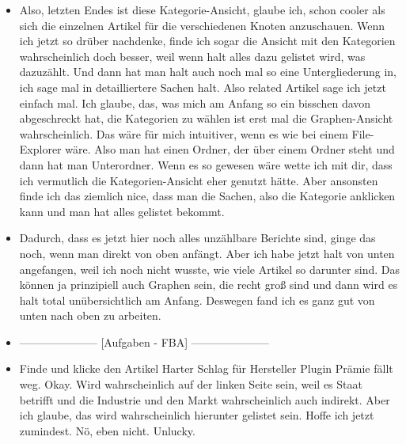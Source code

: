 {\begin{itemize}[]
              Also, dass du beschrieben hast, dass du eher diese Bottom to Top Ansicht bevorzugst, also, dass du eher auf die Artikel klickst.
              Später hast du dann aber auch die Top to Bottom Ansicht ausprobiert.
              Kannst du mir dazu vielleicht noch etwas erzählen?
        \item {} Also, letzten Endes ist diese Kategorie-Ansicht, glaube ich, schon cooler als sich die einzelnen Artikel für die verschiedenen Knoten anzuschauen.
              Wenn ich jetzt so drüber nachdenke, finde ich sogar die Ansicht mit den Kategorien wahrscheinlich doch besser, weil wenn halt alles dazu gelistet wird, was dazuzählt.
              Und dann hat man halt auch noch mal so eine Untergliederung in, ich sage mal in detailliertere Sachen halt. Also related Artikel sage ich jetzt einfach mal.
              Ich glaube, das, was mich am Anfang so ein bisschen davon abgeschreckt hat, die Kategorien zu wählen ist erst mal die Graphen-Ansicht wahrscheinlich.
              Das wäre für mich intuitiver, wenn es wie bei einem File-Explorer wäre.
              Also man hat einen Ordner, der über einem Ordner steht und dann hat man Unterordner.
              Wenn es so gewesen wäre wette ich mit dir, dass ich vermutlich die Kategorien-Ansicht eher genutzt hätte.
              Aber ansonsten finde ich das ziemlich nice, dass man die Sachen, also die Kategorie anklicken kann und man hat alles gelistet bekommt.
        \item {} Dadurch, dass es jetzt hier noch alles unzählbare Berichte sind, ginge das noch, wenn man direkt von oben anfängt.
              Aber ich habe jetzt halt von unten angefangen, weil ich noch nicht wusste, wie viele Artikel so darunter sind.
              Das können ja prinzipiell auch Graphen sein, die recht groß sind und dann wird es halt total unübersichtlich am Anfang.
              Deswegen fand ich es ganz gut von unten nach oben zu arbeiten.
        \item {---------------------} [Aufgaben - FBA] {---------------------}
        \item {} Finde und klicke den Artikel \flqq Harter Schlag für Hersteller Plugin Prämie fällt weg\frqq{}.
              Okay. Wird wahrscheinlich auf der linken Seite sein, weil es Staat betrifft und die Industrie und den Markt wahrscheinlich auch indirekt.
              Aber ich glaube, das wird wahrscheinlich hierunter gelistet sein.
              Hoffe ich jetzt zumindest.
              Nö, eben nicht.
              Unlucky.

\end{itemize}}
